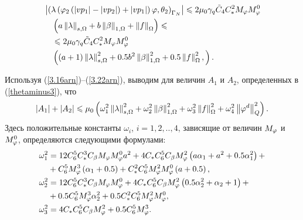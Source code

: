 \begin{equation}
	\begin{split}
		&\left\vert 
			\left( 
				\lambda \left( 
					\varphi_2 \left( 
						\left\vert vp_1 \right\vert - \left\vert vp_2 \right\vert
					 \right) + \left\vert vp_1 \right\vert
				 \right) \varphi, \theta_2
			 \right)_{\Gamma_N}
		 \right\vert 
		\leqslant
			2 \mu_0 \gamma_q 
			\tilde C_4 C_{*}^2 
			M_\varphi  M_\varphi^0 \\
			&\quad \left(  
				a \left\Vert \lambda \right\Vert_{s,\Omega}
				+ b \left\Vert \beta \right\Vert_{1,\Omega} 
				+ \left\Vert f \right\Vert_\Omega 
			 \right) 
		\leqslant \\
		&\quad\leqslant 
			2 \mu_0 \gamma_q 
			\tilde C_4 C_{*}^2 
			M_\varphi  M_\varphi^0 \\
			&\quad \left( 
				(a + 1) 
				\left\Vert \lambda \right\Vert_{s,\Omega}^2 
				+ 0.5 b^2 
				\left\Vert \beta \right\Vert_{1,\Omega}^2 
				+ 0.5 
				\left\Vert f \right\Vert_\Omega^2,
			 \right).
	\end{split}
\end{equation}

Используя (\ref{3.16arn})--(\ref{3.22arn}), выводим для величин $A_1$ и $A_2$, определенных в (\ref{thetaminus3}), что
\begin{equation}
	\label{3.22anew} 
	\left\vert A_1 \right\vert + \left\vert A_2 \right\vert \leqslant 
	\mu_0 
	\left( 
		\omega_1^2 
		\left\Vert \lambda \right\Vert_{s,\Omega}^2 
		+ \omega_2^2 
		\left\Vert \beta \right\Vert_{1,\Omega}^2 
		+ \omega_3^2 
		\left\Vert f \right\Vert_\Omega^2 
		+ \omega_4^2 
		\left\Vert \varphi^d \right\Vert_Q^2
	 \right).
\end{equation}
Здесь положительные константы $\omega_i$, $i=1,2,..,4$,
зависящие от величин $M_\varphi$ и $M_\varphi^0$, определяются следующими формулами:
\begin{equation}
	\label{beta_all} 
	\begin{split}
		\omega_1^2 &= 
			12 C_6^5 C_{*}^3 C_\beta 
			M_\varphi M_\varphi^0 
			a^2 
		+ 4 C_{*} C_6^5 C_\beta 
			M_\varphi^2 
			\left( a \alpha_1 + a^2 + 0.5 \alpha_1^2  \right) + \\
		&+ C_6^5 
			M_\varphi^3 
			\left( \alpha_1 + 0.5 \right) 
		+ C_{*}^2 C_6^5 
			M_\varphi^2 M_\varphi^0 
			\left( a + 0.5 \right), \\
		\omega_2^2 &= 
			12 C_6^5 C_{*} ^3 C_\beta 
			M_\varphi M_\varphi^0 
		+ 4 C_{*} C_6^5 C_\beta 
			M_\varphi^2 
			\left( 0.5 \alpha_2^2 + \alpha_2 + 1 \right) + \\
		&+ 0.5 C_6^5 
		 	M_\varphi^3 
		 	\alpha_2^2 
	 	+ 0.5 C_{*}^2 C_6^5 
	 		M_\varphi^2 M_\varphi^0, \\
		\omega_3^2 &= 
			4 C_{*} C_6^5 C_\beta 
			M_\varphi^2 
		+ 0.5 C_6^5 
			M_\varphi^3.
	\end{split}
\end{equation}

